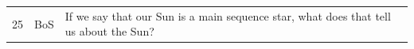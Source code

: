 \documentclass[10pt]{article}
\begin{document}
\begin{tiny}
\begin{longtable}{r p{0.3in} p{1.212in} p{3.8in}}
    25 &          BoS &                                                                                                                                                                                            If we say that our Sun is a main sequence star, what does that tell us about the Sun? &                                                                                                                                                                                                                                                                                                                                                                                                                                                                                                                                                                                                                                                                                                                                                                                                                                                                                                                                                                                                                                                                                                                                                                                                                                                                                                                                                                                                                                                                                                                                                                                                                                                                                                                                                                                                                                                                                                                                                                                                                                                                                                                                                                                                                                                                                                                                                                                                                                                                                                                                                                                                                                                                                                                                                                                                                                                                                                                                                                                                                                                                                               
\end{longtable}
\end{tiny}
\end{document}
